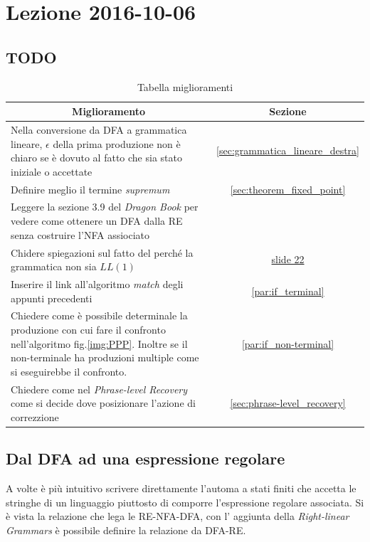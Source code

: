 \section{Lezione 2016-10-06}
\subsection{TODO}
\begin{table}[ht]
\begin{center}
\begin{tabular}{|p{\textwidth}|c|}
\hline
\multicolumn{1}{|c|}{\textbf{Miglioramento}} & \textbf{Sezione} \\ \hline
Nella conversione da DFA a grammatica lineare, $\epsilon$ della prima produzione
non \`e chiaro se \`e dovuto al fatto che sia stato iniziale o accettate &
\ref{sec:grammatica_lineare_destra} \\ \hline
Definire meglio il termine \textit{supremum} &
\ref{sec:theorem_fixed_point} \\ \hline
Leggere la sezione 3.9 del \textit{Dragon Book} per vedere come ottenere un
DFA dalla RE senza costruire l'NFA assiociato & \\ \hline
Chidere spiegazioni sul fatto del perch\'e la grammatica non sia $LL(1)$ &
\href{http://www.di.unipi.it/~andrea/Didattica/PLP-16/SLIDES/PLP-2016-07.pdf}{
slide 22
} \\ \hline
Inserire il link all'algoritmo \textit{match} degli appunti precedenti &
\ref{par:if_terminal} \\ \hline
Chiedere come \`e possibile determinale la produzione con cui fare il confronto
nell'algoritmo fig.\ref{img:PPP}. Inoltre se il non-terminale ha produzioni
multiple come si eseguirebbe il confronto. &
\ref{par:if_non-terminal} \\ \hline
Chiedere come nel \textit{Phrase-level Recovery} come si decide dove posizionare
l'azione di correzzione & \ref{sec:phrase-level_recovery} \\ \hline
\end{tabular}
\end{center}
\caption{Tabella miglioramenti}
\label{tab:tab_todo}
\end{table}


\subsection{Dal DFA ad una espressione regolare}
A volte \`e pi\`u intuitivo scrivere direttamente l'automa a stati finiti che
accetta le stringhe di un linguaggio piuttosto di comporre l'espressione
regolare associata. Si \`e vista la relazione che lega le RE-NFA-DFA, con l'
aggiunta della \textit{Right-linear Grammars} \`e possibile definire la
relazione da DFA-RE.

